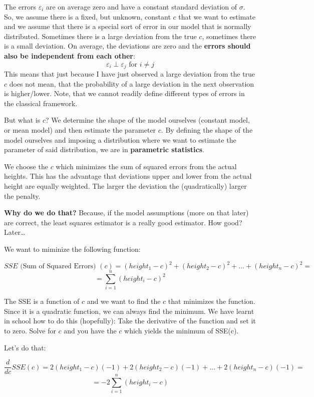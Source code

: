 \documentclass[
]{book}
\begin{document}
The errors \(\varepsilon_i\) are on average zero and have a constant standard deviation of \(\sigma\).
So, we assume there is a fixed, but unknown, constant \(c\) that we want to estimate and we
assume that there is a special sort of error in our model that is normally distributed.
Sometimes there is a large deviation from the true \(c\), sometimes there is a small deviation.
On average, the deviations are zero and the \textbf{errors should also be independent from each other}:
\[ \varepsilon_i \perp \varepsilon_j \text{ for } i \neq j\]
This means that just because I have just observed a large deviation from the true \(c\)
does not mean, that the probability of a large deviation in the next observation is higher/lower.
Note, that we cannot readily define different types of errors in the classical framework.

But what is \(c\)? We determine the shape of the model
ourselves (constant model, or mean model) and then estimate the parameter \(c\).
By defining the shape of the model ourselves and imposing a distribution where we want to
estimate the parameter of said distribution, we are in \textbf{parametric statistics}.

We choose the \(c\) which minimizes the sum of squared errors from the actual heights.
This has the advantage that deviations upper and lower from the actual height are
equally weighted. The larger the deviation the (quadratically) larger the penalty.

\textbf{Why do we do that?} Because, if the model assumptions (more on that later)
are correct, the least squares
estimator is a really good estimator. How good? Later\ldots{}

We want to miminize the following function:

\[ SSE \text{ (Sum of Squared Errors) }(c) = (height_1 - c)^2 + (height_2 - c)^2 + 
\ldots + (height_n - c)^2 =\]
\[ = \sum_{i=1}^{n} (height_i - c)^2\]

The SSE is a function of \(c\) and we want to find the \(c\) that minimizes the function.
Since it is a quadratic function, we can always find the minimum.
We have learnt in school how to do this (hopefully): Take the derivative of the function
and set it to zero. Solve for \(c\) and you have the \(c\) which yields the minimum of SSE(c).

Let's do that:

\[ \frac{d}{dc} SSE(c) =  2(height_1 - c)(-1) + 2(height_2 - c)(-1) + 
\ldots + 2(height_n - c)(-1) =\]
\[ = -2 \sum_{i=1}^{n} (height_i - c)\]
\end{document}
